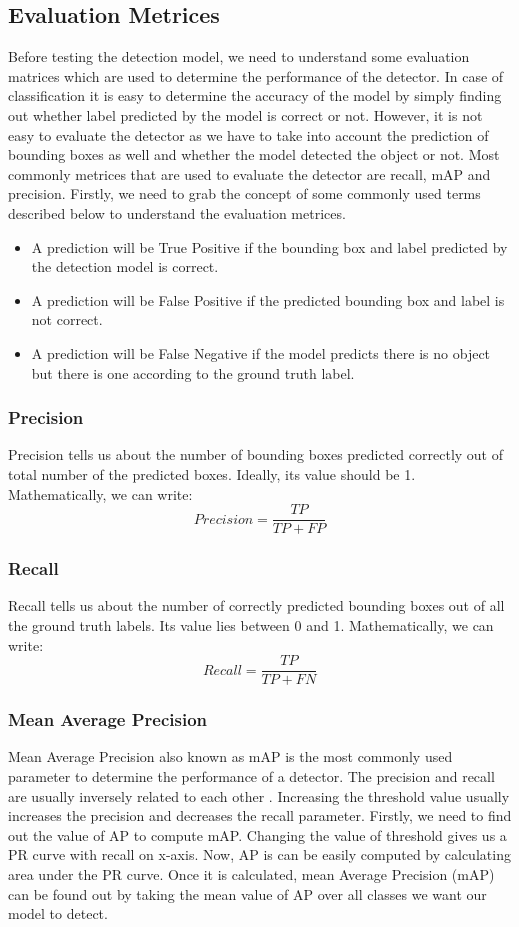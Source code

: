 \subsection{Evaluation Metrices}
Before testing the detection model, we need to understand some evaluation matrices which are used to determine the performance of the detector. In case of classification it is easy to determine the accuracy of the model by simply finding out whether label predicted by the model is correct or not. However, it is not easy to evaluate the detector as we have to take into account the prediction of bounding boxes as well and whether the model detected the object or not. Most commonly metrices that are used to evaluate the detector are recall, mAP and precision. Firstly, we need to grab the concept of some commonly used terms described below to understand the evaluation metrices.
\begin{itemize}
    \item  A prediction will be True Positive if the bounding box and label predicted by the detection model is correct.
    \item A prediction will be False Positive if the predicted bounding box and label is not correct.
    \item A prediction will be False Negative if the model predicts there is no object but there is one according to the ground truth label.
\end{itemize}
\subsubsection{Precision}
Precision tells us about the number of bounding boxes predicted correctly out of total number of the predicted boxes. Ideally, its value should be 1. Mathematically, we can write:
\begin{equation}
    Precision = \frac{TP}{TP + FP}
\end{equation}
\subsubsection{Recall}
Recall tells us about the number of correctly predicted bounding boxes out of all the ground truth labels. Its value lies between 0 and 1. Mathematically, we can write:
\begin{equation}
    Recall = \frac{TP}{TP + FN}
\end{equation}
\subsubsection{Mean Average Precision}
Mean Average Precision also known as mAP is the most commonly used parameter to determine the
performance of a detector. The precision and recall are usually inversely related to each other . Increasing the threshold value usually increases the precision and decreases the recall parameter. Firstly, we need to find out the value of AP to compute mAP. Changing the value of threshold gives us a PR curve with recall on x-axis. Now, AP is can be easily computed by calculating area under the PR curve. Once it is calculated, mean Average Precision (mAP) can be found out by taking the mean value of AP over all classes we want our model to detect.
